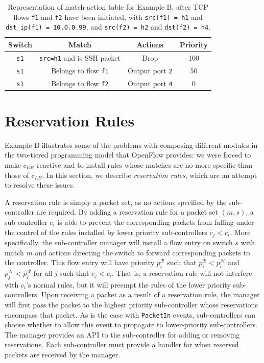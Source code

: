 \documentclass{article}
\begin{document}
\begin{table}
\begin{center}
\begin{tabular}{|c|c|c|c|}
\hline
Switch & Match & Actions & Priority \\
\hline
\texttt{s1} & \texttt{src=h1} and is SSH packet & Drop & 100 \\
\hline
\texttt{s1} & Belongs to flow \texttt{f1} & Output port \texttt{2} & 50 \\
\hline
\texttt{s1} & Belongs to flow \texttt{f2} & Output port \texttt{4} & 0 \\
\hline
\end{tabular}
\end{center}
\caption{Representation of match-action table for Example B, after
TCP flows \texttt{f1} and \texttt{f2} have been initiated, with 
\texttt{src(f1) = h1} and \texttt{dst\_ip(f1) = 10.0.0.99},
and \texttt{src(f2) = h2} and \texttt{dst(f2) = h4}.}
\label{table_B}
\end{table}

\section{Reservation Rules} \label{RES}

Example B illustrates some of the problems with composing different modules
in the two-tiered programming model that OpenFlow provides: we were forced
to make $c_{RR}$ reactive and to install rules whose matches are 
no more specific than those of $c_{LB}$. In this section, we describe
\emph{reservation rules}, which are an attempt to resolve these issues.

A reservation rule is simply a packet set, as no actions specified
by the sub-controller are required. 
By adding a reservation rule for a packet set $(m, s)$, a sub-controller 
$c_i$ is able to prevent the corresponding packets from falling under the 
control of the rules installed by lower priority sub-controllers $c_j < c_i$.
More specifically, the sub-controller manager will install a flow entry 
on switch $s$ with match $m$ and actions directing the switch to 
forward corresponding packets to the controller.
This flow entry will have priority $p_i^{\mathcal{R}}$ such that
$p_i^{\mathcal{R}} < p_i^{\mathcal{N}}$ and 
$p_j^{\mathcal{N}} < p_i^{\mathcal{R}}$ for all $j$ such that $c_j < c_i$.
That is, a reservation rule will not interfere with $c_i$'s
normal rules, but it will preempt the rules of the lower priority sub-controllers.
Upon receiving a packet as a result of a reservation rule, 
the manager will first pass the packet to the highest priority sub-controller 
whose reservations encompass that packet.
As is the case with \texttt{PacketIn} events, sub-controllers
can choose whether to allow this event to propagate to lower-priority
sub-controllers.
The manager provides an API to the sub-controller for adding or removing 
reservations. Each sub-controller must provide a handler for when
reserved packets are received by the manager.
\end{document}
